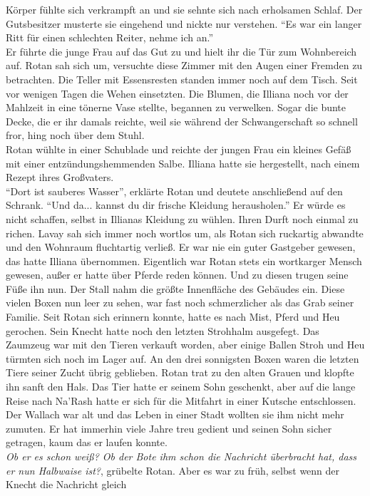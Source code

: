 Körper fühlte sich verkrampft an und sie sehnte sich nach erholsamen Schlaf. Der Gutsbesitzer 
musterte sie eingehend und nickte nur verstehen. ``Es war ein langer Ritt für einen schlechten 
Reiter, nehme ich an.''\\
Er führte die junge Frau auf das Gut zu und hielt ihr die Tür zum Wohnbereich auf. Rotan sah sich 
um, versuchte diese Zimmer mit den Augen einer Fremden zu betrachten. Die Teller mit Essensresten 
standen immer noch auf dem Tisch. Seit vor wenigen Tagen die Wehen einsetzten. Die Blumen, die 
Illiana noch vor der Mahlzeit in eine tönerne Vase stellte, begannen zu verwelken. Sogar die bunte 
Decke, die er ihr damals reichte, weil sie während der Schwangerschaft so schnell fror, hing noch 
über dem Stuhl.\\
Rotan wühlte in einer Schublade und reichte der jungen Frau ein kleines Gefäß mit einer 
entzündungshemmenden Salbe. Illiana hatte sie hergestellt, nach einem Rezept ihres Großvaters.\\
``Dort ist sauberes Wasser'', erklärte Rotan und deutete anschließend auf den Schrank. ``Und da... 
kannst du dir frische Kleidung herausholen.'' Er würde es nicht schaffen, selbst in Illianas 
Kleidung zu wühlen. Ihren Durft noch einmal zu richen. Lavay sah sich immer noch wortlos um, als 
Rotan sich ruckartig abwandte und den Wohnraum fluchtartig verließ. Er war nie ein guter Gastgeber 
gewesen, das hatte Illiana übernommen. Eigentlich war Rotan stets ein wortkarger Mensch gewesen, 
außer er hatte über Pferde reden können. Und zu diesen trugen seine Füße ihn nun. Der Stall nahm 
die größte Innenfläche des Gebäudes ein. Diese vielen Boxen nun leer zu sehen, war fast noch 
schmerzlicher als das Grab seiner Familie. Seit Rotan sich erinnern konnte, hatte es nach Mist, 
Pferd und Heu gerochen. Sein Knecht hatte noch den letzten Strohhalm ausgefegt. Das Zaumzeug war 
mit den Tieren verkauft worden, aber einige Ballen Stroh und Heu türmten sich noch im Lager auf. An 
den drei sonnigsten Boxen waren die letzten Tiere seiner Zucht übrig geblieben. Rotan trat zu den 
alten Grauen und klopfte ihn sanft den Hals. Das Tier hatte er seinem Sohn geschenkt, aber auf die 
lange Reise nach Na'Rash hatte er sich für die Mitfahrt in einer Kutsche entschlossen. Der Wallach 
war alt und das Leben in einer Stadt wollten sie ihm nicht mehr zumuten. Er hat immerhin viele 
Jahre treu gedient und seinen Sohn sicher getragen, kaum das er laufen konnte.\\
\textit{Ob er es schon weiß? Ob der Bote ihm schon die Nachricht überbracht hat, dass er nun 
Halbwaise ist?}, grübelte Rotan. Aber es war zu früh, selbst wenn der Knecht die Nachricht gleich 

